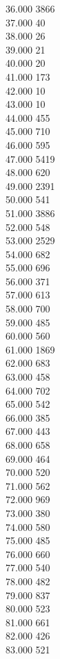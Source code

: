 { 36.000	3866 \\
 37.000	40 \\
 38.000	26 \\
 39.000	21 \\
 40.000	20 \\
 41.000	173 \\
 42.000	10 \\
 43.000	10 \\
 44.000	455 \\
 45.000	710 \\
 46.000	595 \\
 47.000	5419 \\
 48.000	620 \\
 49.000	2391 \\
 50.000	541 \\
 51.000	3886 \\
 52.000	548 \\
 53.000	2529 \\
 54.000	682 \\
 55.000	696 \\
 56.000	371 \\
 57.000	613 \\
 58.000	700 \\
 59.000	485 \\
 60.000	560 \\
 61.000	1869 \\
 62.000	683 \\
 63.000	458 \\
 64.000	702 \\
 65.000	542 \\
 66.000	385 \\
 67.000	443 \\
 68.000	658 \\
 69.000	464 \\
 70.000	520 \\
 71.000	562 \\
 72.000	969 \\
 73.000	380 \\
 74.000	580 \\
 75.000	485 \\
 76.000	660 \\
 77.000	540 \\
 78.000	482 \\
 79.000	837 \\
 80.000	523 \\
 81.000	661 \\
 82.000	426 \\
 83.000	521 \\
}
